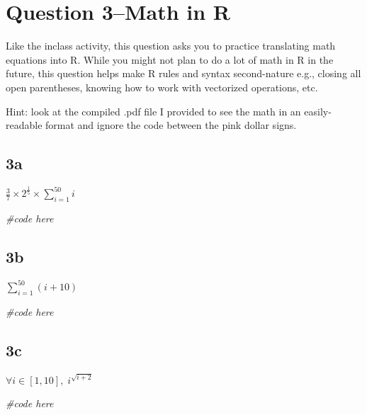 \documentclass[
]{article}
\newenvironment{Shaded}{\begin{snugshade}}{\end{snugshade}}
\newcommand{\CommentTok}[1]{\textcolor[rgb]{0.56,0.35,0.01}{\textit{#1}}}
\begin{document}
\hypertarget{question-3math-in-r}{%
\section{Question 3--Math in R}\label{question-3math-in-r}}

Like the inclass activity, this question asks you to practice
translating math equations into R. While you might not plan to do a lot
of math in R in the future, this question helps make R rules and syntax
second-nature e.g., closing all open parentheses, knowing how to work
with vectorized operations, etc.

Hint: look at the compiled .pdf file I provided to see the math in an
easily-readable format and ignore the code between the pink dollar
signs.

\hypertarget{a-2}{%
\subsection{3a}\label{a-2}}

\(\frac{3}{7} \times2^{\frac{1}{5}} \times \sum_{i=1}^{50} i\)

\begin{Shaded}
\begin{Highlighting}[]
\CommentTok{\#code here}
\end{Highlighting}
\end{Shaded}

\hypertarget{b-2}{%
\subsection{3b}\label{b-2}}

\(\sum_{i=1}^{50} (i+10)\)

\begin{Shaded}
\begin{Highlighting}[]
\CommentTok{\#code here}
\end{Highlighting}
\end{Shaded}

\hypertarget{c-2}{%
\subsection{3c}\label{c-2}}

\(\forall i \in [1,10],\; i^{\sqrt{i+2}}\)

\begin{Shaded}
\begin{Highlighting}[]
\CommentTok{\#code here}
\end{Highlighting}
\end{Shaded}
\end{document}
